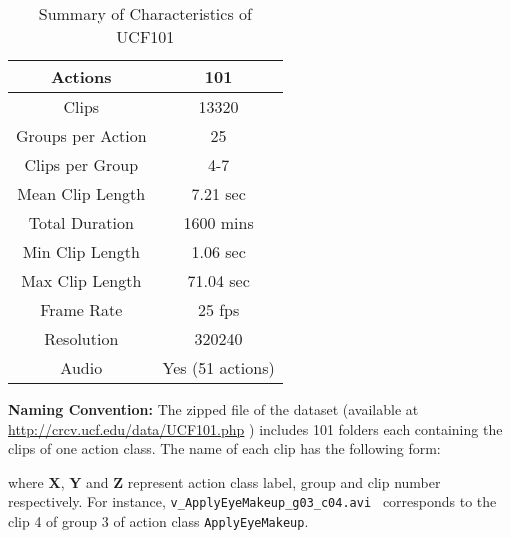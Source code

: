 \documentclass[10pt,twocolumn,letterpaper]{article}
\begin{document}
\begin{table}
\begin{center}
\begin{tabular}{|c||c|}
\hline
Actions & 101 \\
\hline
Clips  & 13320\\
\hline
Groups per Action & 25  \\
\hline
Clips per Group  & 4-7\\
\hline
Mean Clip Length & 7.21 sec  \\
\hline
Total Duration   & 1600 mins \\
\hline
Min Clip Length & 1.06 sec  \\
\hline
 Max Clip Length  & 71.04 sec\\
\hline
Frame Rate & 25 fps  \\
\hline
 Resolution  & 320240\\
\hline
 Audio  & Yes (51 actions)\\
\hline
\end{tabular}
\end{center}
\caption{Summary of Characteristics of UCF101}
\label{tab:summary}
\end{table}



\textbf{Naming Convention:} The zipped file of the dataset (available at \url{http://crcv.ucf.edu/data/UCF101.php} ) includes 101 folders each containing the clips of one action class. The name of each clip has the following form:


where \textbf{X}, \textbf{Y} and \textbf{Z} represent action class label, group and clip number respectively. For instance, {\tt v\_ApplyEyeMakeup\_g03\_c04.avi } corresponds to the clip 4 of group 3 of action class {\tt ApplyEyeMakeup}.
\end{document}
